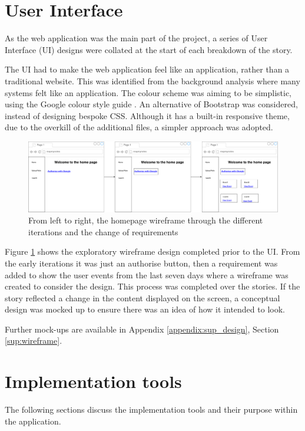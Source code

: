 \section{User Interface}
As the web application was the main part of the project, a series of User Interface (UI) designs were collated at the start of each breakdown of the story.

The UI had to make the web application feel like an application, rather than a traditional website. This was identified from the background analysis where many systems felt like an application. The colour scheme was aiming to be simplistic, using the Google colour style guide \cite{citeulike:14023831}. An alternative of Bootstrap \cite{citeulike:13995818} was considered, instead of designing bespoke CSS. Although it has a built-in responsive theme, due to the overkill of the additional files, a simpler approach was adopted.

\begin{figure}[H]
  \centering
  \includegraphics[scale=0.23]{images/homepage_wiremock.pdf}
  \caption{From left to right, the homepage wireframe through the different iterations and the change of requirements}
  \label{fig:homepage_wireframe}
\end{figure}

Figure \ref{fig:homepage_wireframe} shows the exploratory wireframe design completed prior to the UI. From the early iterations it was just an authorise button, then a requirement was added to show the user events from the last seven days where a wireframe was created to consider the design. This process was completed over the stories. If the story reflected a change in the content displayed on the screen, a conceptual design was mocked up to ensure there was an idea of how it intended to look.


Further mock-ups are available in Appendix \ref{appendix:sup_design}, Section \ref{sup:wireframe}.


\section{Implementation tools}
The following sections discuss the implementation tools and their purpose within the application.
